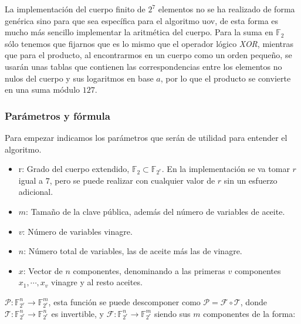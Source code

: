 La implementación del cuerpo finito de $2^7$ elementos no se ha realizado de forma genérica sino para que sea específica para el algoritmo \acrshort{uov}, de esta forma es mucho más sencillo implementar la aritmética del cuerpo. Para la suma en $\mathds{F}_2$ sólo tenemos que fijarnos que es lo mismo que el operador lógico \textit{XOR}, mientras que para el producto, al encontrarmos en un cuerpo como un orden pequeño, se usarán unas tablas que contienen las correspondencias entre los elementos no nulos del cuerpo y sus logaritmos en base $a$, por lo que el producto se convierte en una suma módulo $127$.\\




\subsubsection{Parámetros y fórmula}
Para empezar indicamos los parámetros que serán de utilidad para entender el algoritmo.
\begin{itemize}
	\item r: Grado del cuerpo extendido, $\mathds{F}_2 \subset \mathds{F}_{2^r}$. En la implementación se va tomar $r$ igual a $7$, pero se puede realizar con cualquier valor de $r$ sin un esfuerzo adicional.
	\item $m$: Tamaño de la clave pública, además del número de variables de aceite.
	\item $v$: Número de variables vinagre.
	\item $n$: Número total de variables, las de aceite más las de vinagre.
	\item $x$: Vector de $n$ componentes, denominando a las primeras $v$ componentes  $x_1, \dotsb, x_v$ vinagre y al resto aceites.
	
	
\end{itemize}

$\mathcal{P}: \mathds{F}_{2^r}^n \rightarrow \mathds{F}_{2^r}^m$, esta función se puede descomponer como $\mathcal{P} = \mathcal{F} \circ \mathcal{T}$, donde $\mathcal{T}: \mathds{F}_{2^r}^n \rightarrow \mathds{F}_{2^r}^n$ es invertible, y $\mathcal{F}: \mathds{F}_{2^r}^n \rightarrow \mathds{F}_{2^r}^m$ siendo sus $m$ componentes de la forma:

